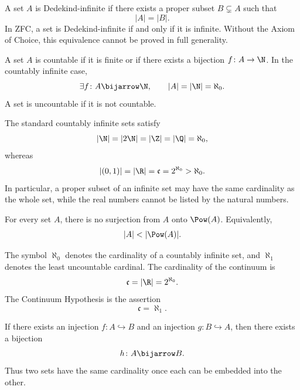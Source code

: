     \begin{definition}
        A set $A$ is Dedekind-infinite if there exists a proper subset
        $B\subsetneq A$ such that
        \[
            |A|=|B|.
        \]
        In ZFC, a set is Dedekind-infinite if and only if it is infinite. Without
        the Axiom of Choice, this equivalence cannot be proved in full
        generality.
    \end{definition}

    \begin{definition}[Countability]
        A set $A$ is countable if it is finite or if there exists a bijection
        $f\colon A\to\N$. In the countably infinite case,
        \[
            \exists f\colon A\bijarrow\N,
            \qquad
            |A|=|\N|=\aleph_0.
        \]
        A set is uncountable if it is not countable.
    \end{definition}

    \begin{theorem}
        The standard countably infinite sets satisfy
        \[
            |\N|=|2\N|=|\Z|=|\Q|=\aleph_0,
        \]
        whereas
        \[
            |(0,1)|=|\R|=\mathfrak{c}=2^{\aleph_0}>\aleph_0.
        \]
        In particular, a proper subset of an infinite set may have the same
        cardinality as the whole set, while the real numbers cannot be listed by
        the natural numbers.
    \end{theorem}


    \begin{theorem}
        For every set $A$, there is no surjection from $A$ onto $\Pow(A)$.
        Equivalently,
        \[
            |A|<|\Pow(A)|.
        \]
    \end{theorem}

    \begin{definition}
        The symbol $\aleph_0$ denotes the cardinality of a countably infinite
        set, and $\aleph_1$ denotes the least uncountable cardinal. The
        cardinality of the continuum is
        \[
            \mathfrak{c}=|\R|=2^{\aleph_0}.
        \]
        The Continuum Hypothesis is the assertion
        \[
            \mathfrak{c}=\aleph_1.
        \]
    \end{definition}

    \begin{theorem}
        If there exists an injection $f\colon A\hookrightarrow B$ and an injection
        $g\colon B\hookrightarrow A$, then there exists a bijection
        \[
            h\colon A\bijarrow B.
        \]
        Thus two sets have the same cardinality once each can be embedded into
        the other.
    \end{theorem}

